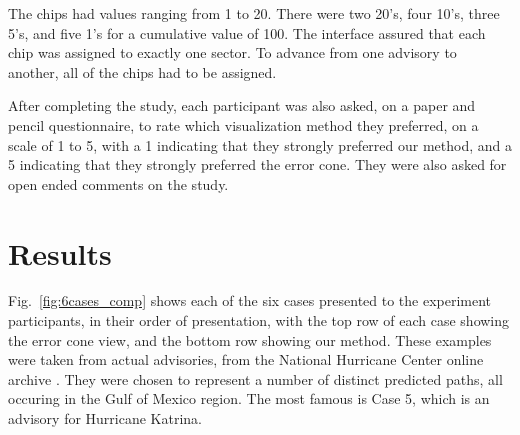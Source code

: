 \documentclass[journal]{vgtc}                %
\begin{document}
The chips had values ranging from 1 to 20. There were two 20's, four 10's, three 5's, and five 1's for a cumulative value of 100. The interface assured that each chip was assigned to exactly one sector. To advance from one advisory to another, all of the chips had to be assigned.

After completing the study, each participant was also asked, on a paper and pencil questionnaire, to rate which visualization method they preferred, on a scale of 1 to 5, with a 1 indicating that they strongly preferred our method, and a 5 indicating that they strongly preferred the error cone. They were also asked for open ended comments on the study.


\section{Results}

Fig.~\ref{fig:6cases_comp} shows each of the six cases presented to the experiment participants, in their order of presentation, with the top
row of each case showing the error cone view, and the bottom row showing our method. These examples were taken from
actual  advisories, from the National Hurricane Center online archive \cite{NHC:2011:ADV}. They were chosen to represent a number of
distinct predicted paths, all occuring in the Gulf of Mexico region. The most famous is Case 5, which is an advisory for Hurricane Katrina.
\end{document}
